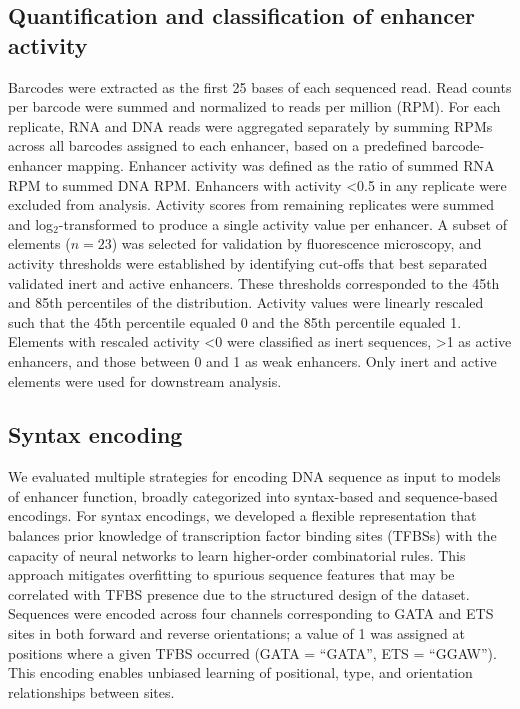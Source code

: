 \subsection{Quantification and classification of enhancer activity}
Barcodes were extracted as the first 25 bases of each sequenced read. Read counts per barcode were summed and normalized to reads per million (RPM). For each replicate, RNA and DNA reads were aggregated separately by summing RPMs across all barcodes assigned to each enhancer, based on a predefined barcode-enhancer mapping. Enhancer activity was defined as the ratio of summed RNA RPM to summed DNA RPM. Enhancers with activity <0.5 in any replicate were excluded from analysis. Activity scores from remaining replicates were summed and log$_2$-transformed to produce a single activity value per enhancer\cite{Ashuach2019-qp}. A subset of elements ($n = 23$) was selected for validation by fluorescence microscopy, and activity thresholds were established by identifying cut-offs that best separated validated inert and active enhancers. These thresholds corresponded to the 45th and 85th percentiles of the distribution. Activity values were linearly rescaled such that the 45th percentile equaled 0 and the 85th percentile equaled 1. Elements with rescaled activity <0 were classified as inert sequences, >1 as active enhancers, and those between 0 and 1 as weak enhancers. Only inert and active elements were used for downstream analysis.

\subsection{Syntax encoding}
We evaluated multiple strategies for encoding DNA sequence as input to models of enhancer function, broadly categorized into syntax-based and sequence-based encodings. For syntax encodings, we developed a flexible representation that balances prior knowledge of transcription factor binding sites (TFBSs) with the capacity of neural networks to learn higher-order combinatorial rules. This approach mitigates overfitting to spurious sequence features that may be correlated with TFBS presence due to the structured design of the dataset. Sequences were encoded across four channels corresponding to GATA and ETS sites in both forward and reverse orientations; a value of 1 was assigned at positions where a given TFBS occurred (GATA = “GATA”, ETS = “GGAW”). This encoding enables unbiased learning of positional, type, and orientation relationships between sites. 

